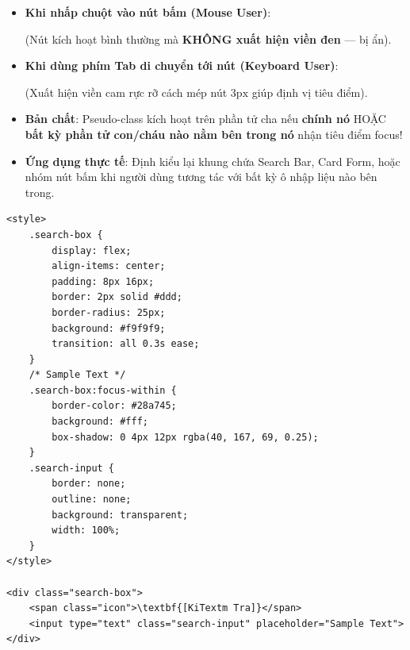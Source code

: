 \begin{browserWindow}
\sffamily\small
\begin{itemize}[leftmargin=1.5em, itemsep=3pt, parsep=0pt]
    \item \textbf{Khi nhấp chuột vào nút bấm (Mouse User)}:
    \par\vspace{2pt}
    \quad (Nút kích hoạt bình thường mà \textbf{KHÔNG xuất hiện viền đen} —  bị ẩn).
    \par\vspace{4pt}
    \item \textbf{Khi dùng phím Tab di chuyển tới nút (Keyboard User)}:
    \par\vspace{2pt}
    \quad (Xuất hiện viền cam rực rỡ  cách mép nút $3\text{px}$ giúp định vị tiêu điểm).
\end{itemize}
\end{browserWindow}

\begin{conceptBox}
\begin{itemize}[leftmargin=1.5em, itemsep=3pt, parsep=0pt]
    \item \textbf{Bản chất}: Pseudo-class  kích hoạt trên phần tử cha nếu \textbf{chính nó} HOẶC \textbf{bất kỳ phần tử con/cháu nào nằm bên trong nó} nhận tiêu điểm focus!
    \item \textbf{Ứng dụng thực tế}: Định kiểu lại khung chứa Search Bar, Card Form, hoặc nhóm nút bấm khi người dùng tương tác với bất kỳ ô nhập liệu nào bên trong.
\end{itemize}

\begin{codeWindow}
\begin{lstlisting}[language=HTML5]
<style>
    .search-box {
        display: flex;
        align-items: center;
        padding: 8px 16px;
        border: 2px solid #ddd;
        border-radius: 25px;
        background: #f9f9f9;
        transition: all 0.3s ease;
    }
    /* Sample Text */
    .search-box:focus-within {
        border-color: #28a745;
        background: #fff;
        box-shadow: 0 4px 12px rgba(40, 167, 69, 0.25);
    }
    .search-input {
        border: none;
        outline: none;
        background: transparent;
        width: 100%;
    }
</style>

<div class="search-box">
    <span class="icon">\textbf{[KiTextm Tra]}</span>
    <input type="text" class="search-input" placeholder="Sample Text">
</div>
\end{lstlisting}
\end{codeWindow}
\end{conceptBox}

